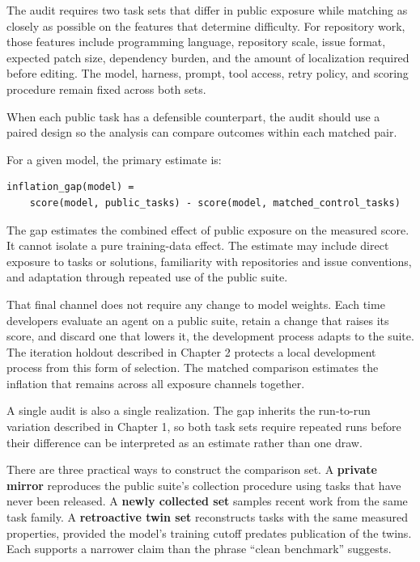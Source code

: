 The audit requires two task sets that differ in public exposure while matching as closely as possible on the features that determine difficulty. For repository work, those features include programming language, repository scale, issue format, expected patch size, dependency burden, and the amount of localization required before editing. The model, harness, prompt, tool access, retry policy, and scoring procedure remain fixed across both sets.

When each public task has a defensible counterpart, the audit should use a paired design so the analysis can compare outcomes within each matched pair.

For a given model, the primary estimate is:

\begin{verbatim}
inflation_gap(model) =
    score(model, public_tasks) - score(model, matched_control_tasks)
\end{verbatim}

The gap estimates the combined effect of public exposure on the measured score. It cannot isolate a pure training-data effect. The estimate may include direct exposure to tasks or solutions, familiarity with repositories and issue conventions, and adaptation through repeated use of the public suite.

That final channel does not require any change to model weights. Each time developers evaluate an agent on a public suite, retain a change that raises its score, and discard one that lowers it, the development process adapts to the suite. The iteration holdout described in Chapter 2 protects a local development process from this form of selection. The matched comparison estimates the inflation that remains across all exposure channels together.

A single audit is also a single realization. The gap inherits the run-to-run variation described in Chapter 1, so both task sets require repeated runs before their difference can be interpreted as an estimate rather than one draw.

There are three practical ways to construct the comparison set. A \textbf{private mirror} reproduces the public suite's collection procedure using tasks that have never been released. A \textbf{newly collected set} samples recent work from the same task family. A \textbf{retroactive twin set} reconstructs tasks with the same measured properties, provided the model's training cutoff predates publication of the twins. Each supports a narrower claim than the phrase ``clean benchmark'' suggests.

